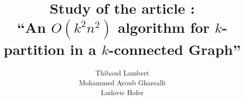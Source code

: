 \documentclass[xcolor=dvipsnames]{beamer}
\title[$O(k^2n^2)$ algorithm for $k$-partitioning]{Study of the article :\\``An $O(k^2n^2)$ algorithm for $k$-partition in a $k$-connected Graph''}
\author[Lambert, Gharsalli, Hofer]
       {Thibaud Lambert\\Mohammed Ayoub Gharsalli\\Ludovic Hofer}
\institute{Université de Bordeaux}
\begin{document}
\begin{frame}[plain]
  \maketitle
\end{frame}







%  
%  
\end{document}
